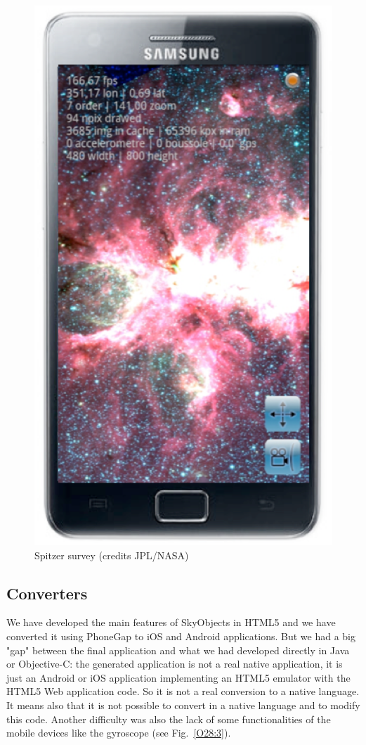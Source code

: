 \begin{figure}[h]
\includegraphics[scale=0.28]{part5/Schaaff_O28/O28_f3.eps}
\caption{Spitzer survey (credits JPL/NASA)} 
\label{O28:2}
\end{figure}

\subsection{Converters}
We have developed the main features of SkyObjects in HTML5 and we have converted it using PhoneGap to iOS and Android applications. But we had a big "gap" between the final application and what we had developed directly in Java or Objective-C: the generated application is not a real native application, it is just an Android or iOS application implementing an HTML5 emulator with the HTML5 Web application code. So it is not a real conversion to a native language. It means also that it is not possible to convert in a native language and to modify this code. Another difficulty was also the lack of some functionalities of the mobile devices like the gyroscope  (see Fig.~\ref{O28:3}).

